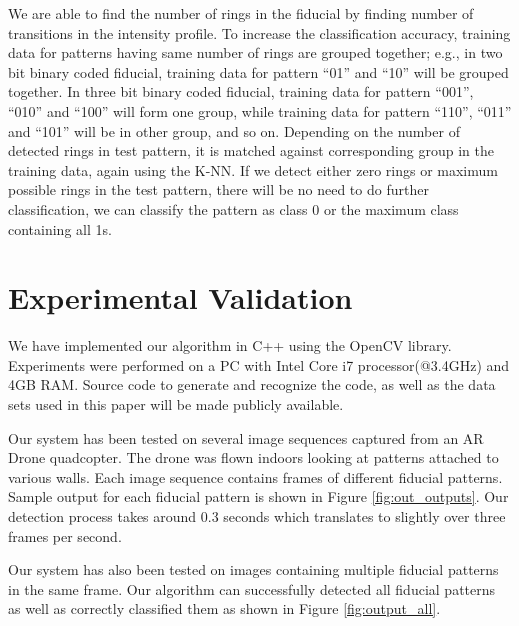 \documentclass[10pt,twocolumn,letterpaper]{article}
\begin{document}
We are able to find the number of rings in the fiducial by finding
number of transitions in the intensity profile. To increase the classification
accuracy, training data for patterns having same number of rings are grouped together; e.g., in two bit
binary coded fiducial, training data for pattern ``01'' and ``10'' will be
grouped together. In three bit binary coded fiducial, training data for pattern
``001'', ``010'' and ``100'' will form one group, while training data for
pattern ``110'', ``011'' and ``101'' will be in other group, and so on. 
Depending on the number of detected rings in test pattern, it is matched
against corresponding group in the training data, again using  the K-NN. 
If we detect either zero rings or maximum possible
rings in the test pattern, there will be no need to do further classification, we
can classify the pattern as class 0 or the maximum class containing all 1s.

\section{Experimental Validation}

We have implemented our algorithm in C++ using the OpenCV library.
Experiments were performed on a PC with Intel Core i7 processor(@3.4GHz) and 4GB RAM.
Source code to generate and recognize the code, as well as the data sets used in
this paper will be made publicly available.  

Our system has been tested on several image sequences captured from an AR Drone
quadcopter.  The drone was flown indoors looking at patterns attached to
various walls. Each image sequence contains frames of different fiducial
patterns. Sample output for each fiducial pattern is shown in Figure
\ref{fig:out_outputs}. Our detection process takes around 0.3 seconds which
translates to slightly over three frames per second.

Our system has also been tested on images containing multiple fiducial patterns
in the same frame. Our algorithm can successfully detected all fiducial patterns as
well as correctly classified them as shown in Figure \ref{fig:output_all}.
\end{document}
